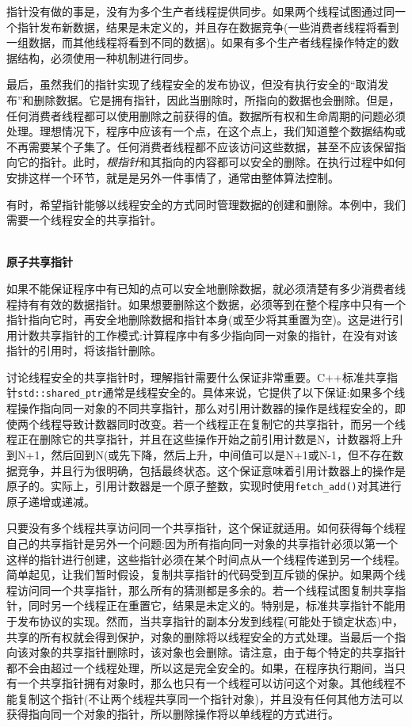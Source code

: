 指针没有做的事是，没有为多个生产者线程提供同步。如果两个线程试图通过同一个指针发布新数据，结果是未定义的，并且存在数据竞争(一些消费者线程将看到一组数据，而其他线程将看到不同的数据)。如果有多个生产者线程操作特定的数据结构，必须使用一种机制进行同步。

最后，虽然我们的指针实现了线程安全的发布协议，但没有执行安全的“取消发布”和删除数据。它是拥有指针，因此当删除时，所指向的数据也会删除。但是，任何消费者线程都可以使用删除之前获得的值。数据所有权和生命周期的问题必须处理。理想情况下，程序中应该有一个点，在这个点上，我们知道整个数据结构或不再需要某个子集了。任何消费者线程都不应该访问这些数据，甚至不应该保留指向它的指针。此时，\textit{根指针}和其指向的内容都可以安全的删除。在执行过程中如何安排这样一个环节，就是是另外一件事情了，通常由整体算法控制。

有时，希望指针能够以线程安全的方式同时管理数据的创建和删除。本例中，我们需要一个线程安全的共享指针。

\hspace*{\fill} \\ %
\noindent
\textbf{原子共享指针}

如果不能保证程序中有已知的点可以安全地删除数据，就必须清楚有多少消费者线程持有有效的数据指针。如果想要删除这个数据，必须等到在整个程序中只有一个指针指向它时，再安全地删除数据和指针本身(或至少将其重置为空)。这是进行引用计数共享指针的工作模式:计算程序中有多少指向同一对象的指针，在没有对该指针的引用时，将该指针删除。

讨论线程安全的共享指针时，理解指针需要什么保证非常重要。C++标准共享指针\texttt{std::shared\_ptr}通常是线程安全的。具体来说，它提供了以下保证:如果多个线程操作指向同一对象的不同共享指针，那么对引用计数器的操作是线程安全的，即使两个线程导致计数器同时改变。若一个线程正在复制它的共享指针，而另一个线程正在删除它的共享指针，并且在这些操作开始之前引用计数是N，计数器将上升到N+1，然后回到N(或先下降，然后上升，中间值可以是N+1或N-1，但不存在数据竞争，并且行为很明确，包括最终状态。这个保证意味着引用计数器上的操作是原子的。实际上，引用计数器是一个原子整数，实现时使用\texttt{fetch\_add()}对其进行原子递增或递减。

只要没有多个线程共享访问同一个共享指针，这个保证就适用。如何获得每个线程自己的共享指针是另外一个问题:因为所有指向同一对象的共享指针必须以第一个这样的指针进行创建，这些指针必须在某个时间点从一个线程传递到另一个线程。简单起见，让我们暂时假设，复制共享指针的代码受到互斥锁的保护。如果两个线程访问同一个共享指针，那么所有的猜测都是多余的。若一个线程试图复制共享指针，同时另一个线程正在重置它，结果是未定义的。特别是，标准共享指针不能用于发布协议的实现。然而，当共享指针的副本分发到线程(可能处于锁定状态)中，共享的所有权就会得到保护，对象的删除将以线程安全的方式处理。当最后一个指向该对象的共享指针删除时，该对象也会删除。请注意，由于每个特定的共享指针都不会由超过一个线程处理，所以这是完全安全的。如果，在程序执行期间，当只有一个共享指针拥有对象时，那么也只有一个线程可以访问这个对象。其他线程不能复制这个指针(不让两个线程共享同一个指针对象)，并且没有任何其他方法可以获得指向同一个对象的指针，所以删除操作将以单线程的方式进行。

